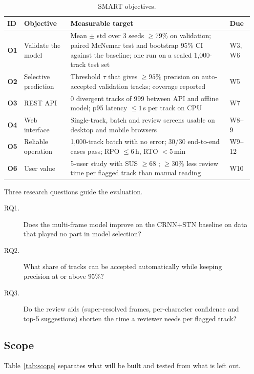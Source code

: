 \begin{table}[tbp]
\centering
\caption{SMART objectives.}
\label{tab:objectives}
\begin{tabularx}{\textwidth}{@{}>{\bfseries}l P{27mm} L l@{}}
\toprule
ID & Objective & Measurable target & Due \\
\midrule
O1 & Validate the model & Mean $\pm$ std over 3 seeds $\ge 79\%$ on validation; paired McNemar test and bootstrap 95\% CI against the baseline; one run on a sealed 1{,}000-track test set & W3, W6 \\
O2 & Selective prediction & Threshold $\tau$ that gives $\ge 95\%$ precision on auto-accepted validation tracks; coverage reported & W5 \\
O3 & REST API & 0 divergent tracks of 999 between API and offline model; p95 latency $\le 1$\,s per track on CPU & W7 \\
O4 & Web interface & Single-track, batch and review screens usable on desktop and mobile browsers & W8--9 \\
O5 & Reliable operation & 1{,}000-track batch with no error; 30/30 end-to-end cases pass; RPO $\le 6$\,h, RTO $< 5$\,min & W9--12 \\
O6 & User value & 5-user study with SUS $\ge 68$ \cite{brooke1996sus}; $\ge 30\%$ less review time per flagged track than manual reading & W10 \\
\bottomrule
\end{tabularx}
\end{table}

Three research questions guide the evaluation.

\begin{description}
  \item[RQ1.] Does the multi-frame model improve on the CRNN+STN baseline on data that played no
        part in model selection?
  \item[RQ2.] What share of tracks can be accepted automatically while keeping precision at or
        above $95\%$?
  \item[RQ3.] Do the review aids (super-resolved frames, per-character confidence and top-5
        suggestions) shorten the time a reviewer needs per flagged track?
\end{description}

\subsection{Scope}

Table~\ref{tab:scope} separates what will be built and tested from what is left out.

